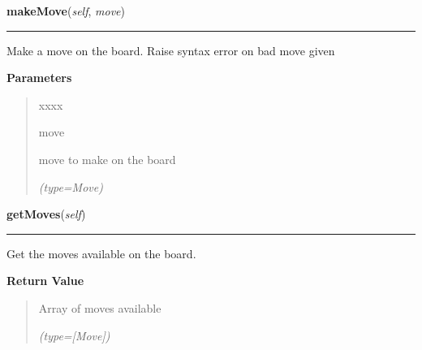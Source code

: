 \hspace{.8\funcindent}\begin{boxedminipage}{\funcwidth}

    \raggedright \textbf{makeMove}(\textit{self}, \textit{move})

    \vspace{-1.5ex}

    \rule{\textwidth}{0.5\fboxrule}
\setlength{\parskip}{2ex}
    Make a move on the board. Raise syntax error on bad move given

\setlength{\parskip}{1ex}
      \textbf{Parameters}
      \vspace{-1ex}

      \begin{quote}
        \begin{Ventry}{xxxx}

          \item[move]

          move to make on the board

            {\it (type=Move)}

        \end{Ventry}

      \end{quote}

    \end{boxedminipage}

    \label{UnBlockMe:Map:Map:Map:getMoves}

    \vspace{0.5ex}

\hspace{.8\funcindent}\begin{boxedminipage}{\funcwidth}

    \raggedright \textbf{getMoves}(\textit{self})

    \vspace{-1.5ex}

    \rule{\textwidth}{0.5\fboxrule}
\setlength{\parskip}{2ex}
    Get the moves available on the board.

\setlength{\parskip}{1ex}
      \textbf{Return Value}
    \vspace{-1ex}

      \begin{quote}
      Array of moves available

      {\it (type=[Move])}

      \end{quote}

    \end{boxedminipage}

